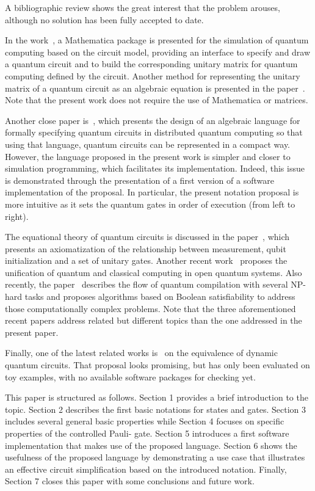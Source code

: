 A bibliographic review shows the great interest that the problem arouses, although no solution has been fully accepted to date.

In the work~\cite{gerdt}, a Mathematica package is presented for the simulation of quantum computing based on the circuit model, providing an interface to specify and draw a quantum circuit and to build the corresponding unitary matrix for quantum computing defined by the circuit.
Another method for representing the unitary matrix of a quantum circuit as an algebraic equation is presented in the paper~\cite{Hutsell}.
Note that the present work does not require the use of Mathematica or matrices.

Another close paper is~\cite{Ying}, which presents the design of an algebraic language for formally specifying quantum circuits in distributed quantum computing so that using that language, quantum circuits can be represented in a compact way. However, the language proposed in the present work is simpler and closer to simulation programming, which facilitates its implementation. Indeed, this issue is demonstrated through the presentation of a first version of a software implementation of the proposal. In particular, the present notation proposal is more intuitive as it sets the quantum gates in order of execution (from left to right).

The equational theory of quantum circuits is discussed in the paper~\cite{Staton}, which presents an axiomatization of the relationship between measurement, qubit initialization and a set of unitary gates. Another recent work~\cite{Wang19} proposes the unification of quantum and classical computing in open quantum systems.
Also recently, the paper~\cite{doi:10.1098/rsta.2019.0161} describes the flow of quantum compilation with several NP-hard tasks and proposes algorithms based on Boolean satisfiability to address those computationally complex problems. Note that the three  aforementioned recent papers address related but different topics than the one addressed in the present paper.

Finally, one of the latest related  works is~\cite{Wang21} on the equivalence of dynamic quantum circuits. That proposal looks promising, but has only been evaluated on toy examples, with no available software packages for  checking yet.

This paper is structured as follows. Section 1 provides a brief introduction to the topic. Section 2 describes the first basic notations for states and gates.  Section 3 includes several  general basic properties  while Section 4 focuses on specific properties of the controlled Pauli- gate. Section 5 introduces a first software implementation that makes use of the proposed language.
Section 6 shows the usefulness of the proposed language by demonstrating a use case that   illustrates an effective circuit simplification based on the introduced notation.
Finally, Section 7 closes this paper with some conclusions and future work.

